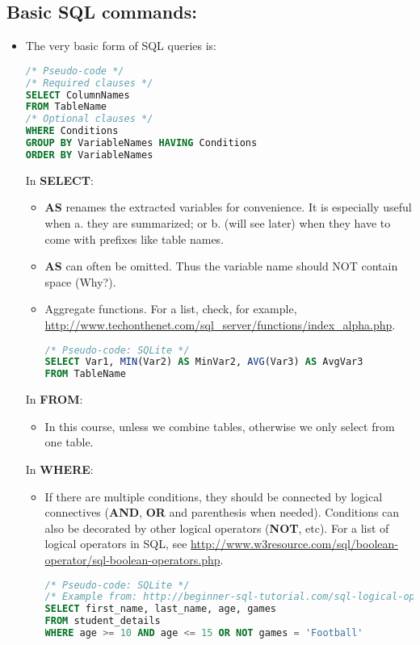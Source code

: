 \documentclass[12pt]{article}
\begin{document}
\subsection{Basic SQL commands:}
\begin{itemize}
	\item The very basic form of SQL queries is:
\begin{lstlisting}[style=displaycode, language=SQL]
/* Pseudo-code */
/* Required clauses */
SELECT ColumnNames
FROM TableName
/* Optional clauses */
WHERE Conditions
GROUP BY VariableNames HAVING Conditions
ORDER BY VariableNames
\end{lstlisting}
	In {\bf SELECT}:
	\begin{itemize}[label=*] 
		\item {\bf AS} renames the extracted variables for convenience. It is especially useful when a. they are summarized; or b. (will see later) when they have to come with prefixes like table names.
		\item {\bf AS} can often be omitted. Thus the variable name should NOT contain space (Why?).
		\item Aggregate functions. For a list, check, for example, \url{http://www.techonthenet.com/sql_server/functions/index_alpha.php}.
\begin{lstlisting}[style=displaycode, language=SQL]
/* Pseudo-code: SQLite */
SELECT Var1, MIN(Var2) AS MinVar2, AVG(Var3) AS AvgVar3
FROM TableName
\end{lstlisting}
	\end{itemize}
	In {\bf FROM}:
	\begin{itemize}[label=*]
		\item In this course, unless we combine tables, otherwise we only select from one table.
	\end{itemize}
	In {\bf WHERE}:
	\begin{itemize}[label=*]
		\item If there are multiple conditions, they should be connected by logical connectives ({\bf AND}, {\bf OR} and parenthesis when needed). Conditions can also be decorated by other logical operators ({\bf NOT}, etc). For a list of logical operators in SQL, see \url{http://www.w3resource.com/sql/boolean-operator/sql-boolean-operators.php}.
\begin{lstlisting}[style=displaycode, language=SQL]
/* Pseudo-code: SQLite */
/* Example from: http://beginner-sql-tutorial.com/sql-logical-operators.htm */
SELECT first_name, last_name, age, games 
FROM student_details 
WHERE age >= 10 AND age <= 15 OR NOT games = 'Football'

\end{lstlisting}
\end{itemize}
\end{itemize}
\end{document}
